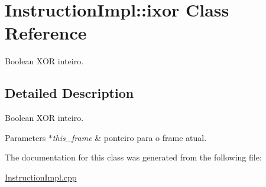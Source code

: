 \hypertarget{class_instruction_impl_1_1ixor}{}\section{Instruction\+Impl\+:\+:ixor Class Reference}
\label{class_instruction_impl_1_1ixor}


Boolean X\+OR inteiro.  




\subsection{Detailed Description}
Boolean X\+OR inteiro. 


\begin{DoxyParams}{Parameters}
{\em $\ast$this\+\_\+frame} & ponteiro para o frame atual.  \\
\hline
\end{DoxyParams}


The documentation for this class was generated from the following file\+:\begin{DoxyCompactItemize}
\item 
\hyperlink{_instruction_impl_8cpp}{Instruction\+Impl.\+cpp}\end{DoxyCompactItemize}
